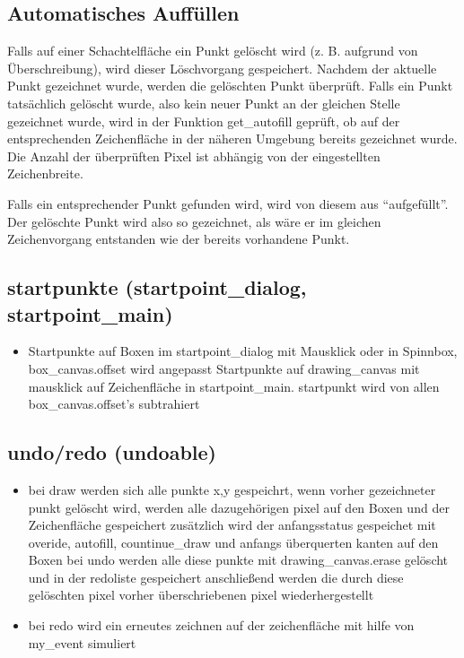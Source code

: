 \subsection{Automatisches Auffüllen}

Falls auf einer Schachtelfläche ein Punkt gelöscht wird (z. B. aufgrund
von Überschreibung), wird dieser Löschvorgang gespeichert. Nachdem
der aktuelle Punkt gezeichnet wurde, werden die gelöschten Punkt überprüft.
Falls ein Punkt tatsächlich gelöscht wurde, also kein neuer Punkt
an der gleichen Stelle gezeichnet wurde, wird in der Funktion get\_autofill
geprüft, ob auf der entsprechenden Zeichenfläche in der näheren Umgebung
bereits gezeichnet wurde. Die Anzahl der überprüften Pixel ist abhängig
von der eingestellten Zeichenbreite.

Falls ein entsprechender Punkt gefunden wird, wird von diesem aus
{}``aufgefüllt''. Der gelöschte Punkt wird also so gezeichnet, als
wäre er im gleichen Zeichenvorgang entstanden wie der bereits vorhandene
Punkt. 

%

\subsection{startpunkte (startpoint\_dialog, startpoint\_main)}
\begin{itemize}
\item Startpunkte auf Boxen im startpoint\_dialog mit Mausklick oder in
Spinnbox, box\_canvas.offset wird angepasst Startpunkte auf drawing\_canvas
mit mausklick auf Zeichenfläche in startpoint\_main. startpunkt wird
von allen box\_canvas.offset's subtrahiert
\end{itemize}

\subsection{undo/redo (undoable)}
\begin{itemize}
\item bei draw werden sich alle punkte x,y gespeichrt, wenn vorher gezeichneter
punkt gelöscht wird, werden alle dazugehörigen pixel auf den Boxen
und der Zeichenfläche gespeichert zusätzlich wird der anfangsstatus
gespeichet mit overide, autofill, countinue\_draw und anfangs überquerten
kanten auf den Boxen bei undo werden alle diese punkte mit drawing\_canvas.erase
gelöscht und in der redoliste gespeichert anschließend werden die
durch diese gelöschten pixel vorher überschriebenen pixel wiederhergestellt
\item bei redo wird ein erneutes zeichnen auf der zeichenfläche mit hilfe
von my\_event simuliert
\end{itemize}

